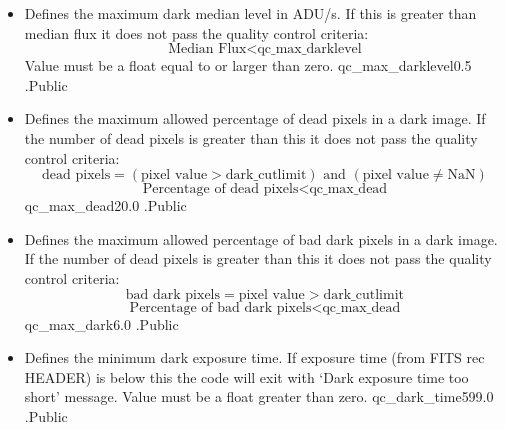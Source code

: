 \begin{itemize}

\item {} 
{Defines the maximum dark median level in ADU/s. If this is greater than median flux it does not pass the quality control criteria:
\begin{equation}
\text{Median Flux} < \text{qc\_max\_darklevel}
\end{equation}
Value must be a float equal to or larger than zero. 
}
{qc\_max\_darklevel}{0.5}
{\calDARK}{\constantsfile}{\calDARK.\progMAIN}{Public}


\item {} 
{Defines the maximum allowed percentage of dead pixels in a dark image. If the number of dead pixels is greater than this it does not pass the quality control criteria:
\begin{equation}
\text{dead pixels} = (\text{pixel value} > \text{dark\_cutlimit}) \text{ and } (\text{pixel value} \neq \text{NaN})
\end{equation}
\begin{equation}
\text{Percentage of dead pixels} < \text{qc\_max\_dead}
\end{equation}
}
{qc\_max\_dead}{20.0}
{\calDARK}{\constantsfile}{\calDARK.\progMAIN}{Public}


\item {} 
{Defines the maximum allowed percentage of bad dark pixels in a dark image. If the number of dead pixels is greater than this it does not pass the quality control criteria:
\begin{equation}
\text{bad dark pixels} = \text{pixel value} > \text{dark\_cutlimit}
\end{equation}
\begin{equation}
\text{Percentage of bad dark pixels} < \text{qc\_max\_dead}
\end{equation}
}
{qc\_max\_dark}{6.0}
{\calDARK}{\constantsfile}{\calDARK.\progMAIN}{Public}


\item {}
{Defines the minimum dark exposure time. If exposure time (from FITS rec HEADER) is below this the code will exit with `Dark exposure time too short' message. Value must be a float greater than zero.}
{qc\_dark\_time}{599.0}
{\calDARK}{\constantsfile}{\calDARK.\progMAIN}{Public}



\end{itemize}
